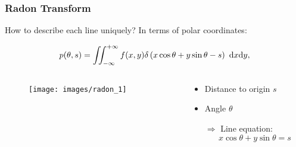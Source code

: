 \begin{frame}
	\frametitle{Radon Transform}
	How to describe each line uniquely? In terms of polar coordinates:

	\begin{equation}
		\label{eqn:ct_radon_2}
		p(\theta, s) =\iint_{-\infty}^{+\infty} f(x,y) \delta\left(x \cos \theta + y \sin \theta - s\right) \ \textnormal{d}x\textnormal{d}y,
	\end{equation}

	\begin{columns}[c, onlytextwidth]
		\begin{column}{0.5\textwidth}
			\begin{figure}[tbp]
				\centering
				\texttt{[image: images/radon\_1]}%
				\label{fig:ct_radon_1}
			\end{figure}
		\end{column}\begin{column}{0.5\textwidth}
			\begin{itemize}
				\setlength\itemsep{0.3cm}
				\item Distance to origin $s$
				\item Angle $\theta$
				\item[$\Rightarrow$] Line equation:
				      \begin{equation}
					      x \cos{\theta} + y \sin{\theta} = s
				      \end{equation}
			\end{itemize}
		\end{column}
	\end{columns}

\end{frame}


